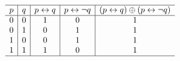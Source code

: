 {{\begin{practices}
\begin{enumerate}[a)]
                {
                    \begin{table}[H]
                        \[
                            \begin{array}{c|c|c|c|c}
                                \hline
                                p & q & p \leftrightarrow q & p \leftrightarrow \neg q & (p \leftrightarrow q) \oplus (p \leftrightarrow \neg q)\\
                                \hline
                                0 & 0 & 1 & 0 & 1 \\
                                0 & 1 & 0 & 1 & 1 \\
                                1 & 0 & 0 & 1 & 1 \\
                                1 & 1 & 1 & 0 & 1 \\
                                \hline
                            \end{array}
                        \]
                    \end{table}
                }
            \end{enumerate}
        \end{practices}

}}
